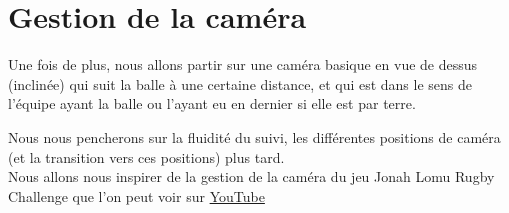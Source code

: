 \section{Gestion de la caméra}
Une fois de plus, nous allons partir sur une caméra basique en vue de dessus (inclinée) qui suit la balle à une certaine distance, et qui est dans le sens de l'équipe ayant la balle ou l'ayant eu en dernier si elle est par terre.

Nous nous pencherons sur la fluidité du suivi, les différentes positions de caméra (et la transition vers ces positions) plus tard.\\

Nous allons nous inspirer de la gestion de la caméra du jeu Jonah Lomu Rugby Challenge que l'on peut voir sur \href{http://www.youtube.com/watch?v=lZqAyglWhdw}{YouTube}


